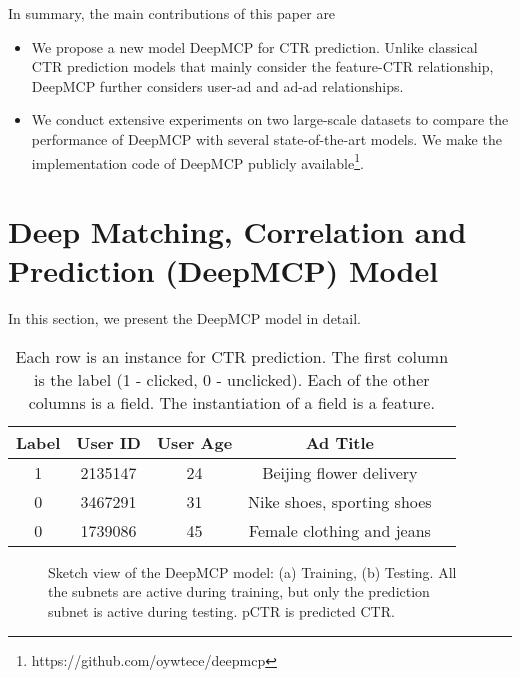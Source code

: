 \documentclass{article}
\begin{document}
In summary, the main contributions of this paper are
\begin{itemize} \item We propose a new model DeepMCP for CTR prediction. Unlike classical CTR prediction models that mainly consider the feature-CTR relationship, DeepMCP further considers user-ad and ad-ad relationships.
\item We conduct extensive experiments on two large-scale datasets to compare the performance of DeepMCP with several state-of-the-art models. We make the implementation code of DeepMCP publicly available\footnote{https://github.com/oywtece/deepmcp}.
\end{itemize}

\section{Deep Matching, Correlation and Prediction (DeepMCP) Model} \label{sec_deepmcp}
In this section, we present the DeepMCP model in detail.

\begin{table}[!t]
\setlength{\tabcolsep}{3pt}
\renewcommand{\arraystretch}{1.2}
\centering
\begin{tabular}{|c|c|c|c|c|}
\hline
\textbf{Label} & \textbf{User ID} & \textbf{User Age} & \textbf{Ad Title} \\
\hline
1 & 2135147 & 24 & Beijing flower delivery \\
\hline
0 & 3467291 & 31 & Nike shoes, sporting shoes \\
\hline
0 & 1739086 & 45 & Female clothing and jeans \\
\hline
\end{tabular}
\vskip -4pt
\caption{Each row is an instance for CTR prediction. The first column is the label (1 - clicked, 0 - unclicked). Each of the other columns is a field. The instantiation of a field is a feature.}
\label{tab_ft}
\vskip -4pt
\end{table}

\begin{figure}[!t]
\centering
{} \vskip -5pt
\vskip -4pt
\caption{Sketch view of the DeepMCP model: (a) Training, (b) Testing. All the subnets are active during training, but only the prediction subnet is active during testing. pCTR is predicted CTR.}
\vskip -6pt
\label{model_sketch}
\end{figure}
\end{document}
